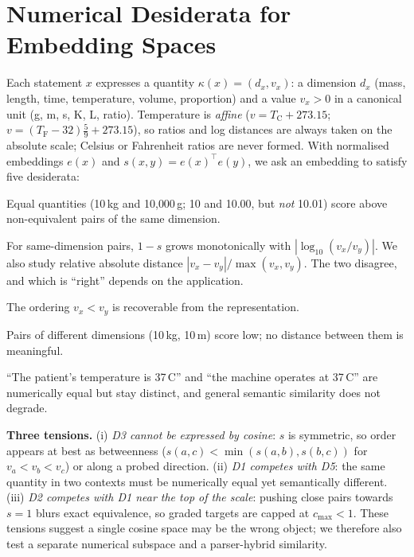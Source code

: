 \documentclass[conference]{IEEEtran}
\begin{document}
\section{Numerical Desiderata for Embedding Spaces}
\label{sec:form}
Each statement $x$ expresses a quantity $\kappa(x)=(d_x,v_x)$: a dimension $d_x$ (mass, length, time, temperature,
volume, proportion) and a value $v_x>0$ in a canonical unit (g, m, s, K, L, ratio). Temperature is \emph{affine}
($v=T_{\mathrm C}+273.15$; $v=(T_{\mathrm F}-32)\tfrac59+273.15$), so ratios and log distances are always taken on the
absolute scale; Celsius or Fahrenheit ratios are never formed. With normalised embeddings $e(x)$ and
$s(x,y)=e(x)^\top e(y)$, we ask an embedding to satisfy five desiderata:
\begin{description}[leftmargin=0pt,itemsep=1pt,topsep=2pt]
\item[D1 Equivalence.] Equal quantities (10\,kg and 10{,}000\,g; 10 and 10.00, but \emph{not} 10.01) score above
non-equivalent pairs of the same dimension.
\item[D2 Graded distance.] For same-dimension pairs, $1-s$ grows monotonically with $|\log_{10}(v_x/v_y)|$. We also
study relative absolute distance $|v_x-v_y|/\max(v_x,v_y)$. The two disagree, and which is ``right'' depends on the
application.
\item[D3 Order.] The ordering $v_x<v_y$ is recoverable from the representation.
\item[D4 Dimensional separation.] Pairs of different dimensions (10\,kg, 10\,m) score low; no distance between them is
meaningful.
\item[D5 Context and semantics.] ``The patient's temperature is 37\,\textdegree C'' and ``the machine operates at
37\,\textdegree C'' are numerically equal but stay distinct, and general semantic similarity does not degrade.
\end{description}

\textbf{Three tensions.} (i) \emph{D3 cannot be expressed by cosine}: $s$ is symmetric, so order appears at best as
betweenness ($s(a,c)<\min(s(a,b),s(b,c))$ for $v_a<v_b<v_c$) or along a probed direction. (ii) \emph{D1 competes with
D5}: the same quantity in two contexts must be numerically equal yet semantically different. (iii) \emph{D2 competes
with D1 near the top of the scale}: pushing close pairs towards $s=1$ blurs exact equivalence, so graded targets are
capped at $c_{\max}<1$. These tensions suggest a single cosine space may be the wrong object; we therefore also test a
separate numerical subspace and a parser-hybrid similarity.
\end{document}
